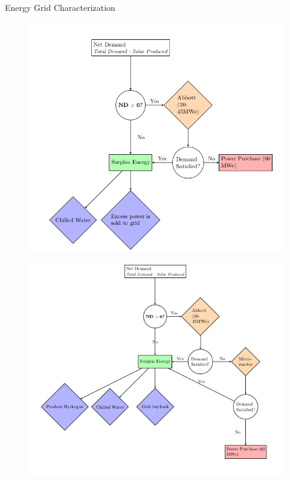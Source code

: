\documentclass[final]{beamer}
\newlength{\onecolwid}
\newlength{\threecolwid}
\begin{document}
\begin{frame}[t]
\begin{columns}[t,totalwidth=\threecolwid]
\begin{column}{\onecolwid}
\begin{block}{Energy Grid Characterization}
\begin{figure}
	\centering
	\begin{minipage}{0.48\linewidth}
		\centering
		\label{fig:grid}
		\includegraphics[width=\linewidth]{../figures/campus_grid_breakdown.png}
	\end{minipage}
	\begin{minipage}{0.48\linewidth}
		\centering
		\label{fig:future_grid}
		\includegraphics[width=\linewidth]{../figures/uiuc-es2.png}
	\end{minipage}
\end{figure}


\end{block}
\end{column}
\end{columns}
\end{frame}
\end{document}
